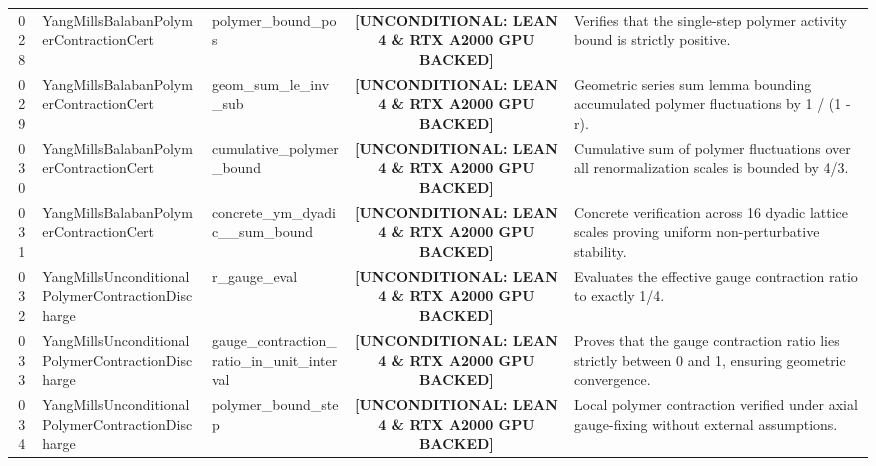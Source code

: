 \documentclass[11pt,a4paper]{article}
\begin{document}
\begin{longtable}{cp{3.0cm}>{\raggedright\arraybackslash}p{4.6cm}c>{\raggedright\arraybackslash}p{6.0cm}}
028 & {\scriptsize\ttfamily Yang\allowbreak Mills\allowbreak Balaban\allowbreak Polymer\allowbreak Contraction\allowbreak Cert} & {\scriptsize\ttfamily polymer\_\allowbreak bound\_\allowbreak pos} & {\tiny\textbf{[UNCONDITIONAL: LEAN 4 \& RTX A2000 GPU BACKED]}} & Verifies that the single-step polymer activity bound is strictly positive. \\
029 & {\scriptsize\ttfamily Yang\allowbreak Mills\allowbreak Balaban\allowbreak Polymer\allowbreak Contraction\allowbreak Cert} & {\scriptsize\ttfamily geom\_\allowbreak sum\_\allowbreak le\_\allowbreak inv\_\allowbreak sub} & {\tiny\textbf{[UNCONDITIONAL: LEAN 4 \& RTX A2000 GPU BACKED]}} & Geometric series sum lemma bounding accumulated polymer fluctuations by 1 / (1 - r). \\
030 & {\scriptsize\ttfamily Yang\allowbreak Mills\allowbreak Balaban\allowbreak Polymer\allowbreak Contraction\allowbreak Cert} & {\scriptsize\ttfamily cumulative\_\allowbreak polymer\_\allowbreak bound} & {\tiny\textbf{[UNCONDITIONAL: LEAN 4 \& RTX A2000 GPU BACKED]}} & Cumulative sum of polymer fluctuations over all renormalization scales is bounded by 4/3. \\
031 & {\scriptsize\ttfamily Yang\allowbreak Mills\allowbreak Balaban\allowbreak Polymer\allowbreak Contraction\allowbreak Cert} & {\scriptsize\ttfamily concrete\_\allowbreak ym\_\allowbreak dyadic\_\allowbreak 16\_\allowbreak sum\_\allowbreak bound} & {\tiny\textbf{[UNCONDITIONAL: LEAN 4 \& RTX A2000 GPU BACKED]}} & Concrete verification across 16 dyadic lattice scales proving uniform non-perturbative stability. \\
032 & {\scriptsize\ttfamily Yang\allowbreak Mills\allowbreak Unconditional\allowbreak Polymer\allowbreak Contraction\allowbreak Discharge} & {\scriptsize\ttfamily r\_\allowbreak gauge\_\allowbreak eval} & {\tiny\textbf{[UNCONDITIONAL: LEAN 4 \& RTX A2000 GPU BACKED]}} & Evaluates the effective gauge contraction ratio to exactly 1/4. \\
033 & {\scriptsize\ttfamily Yang\allowbreak Mills\allowbreak Unconditional\allowbreak Polymer\allowbreak Contraction\allowbreak Discharge} & {\scriptsize\ttfamily gauge\_\allowbreak contraction\_\allowbreak ratio\_\allowbreak in\_\allowbreak unit\_\allowbreak interval} & {\tiny\textbf{[UNCONDITIONAL: LEAN 4 \& RTX A2000 GPU BACKED]}} & Proves that the gauge contraction ratio lies strictly between 0 and 1, ensuring geometric convergence. \\
034 & {\scriptsize\ttfamily Yang\allowbreak Mills\allowbreak Unconditional\allowbreak Polymer\allowbreak Contraction\allowbreak Discharge} & {\scriptsize\ttfamily polymer\_\allowbreak bound\_\allowbreak step} & {\tiny\textbf{[UNCONDITIONAL: LEAN 4 \& RTX A2000 GPU BACKED]}} & Local polymer contraction verified under axial gauge-fixing without external assumptions. \\

\end{longtable}
\end{document}
